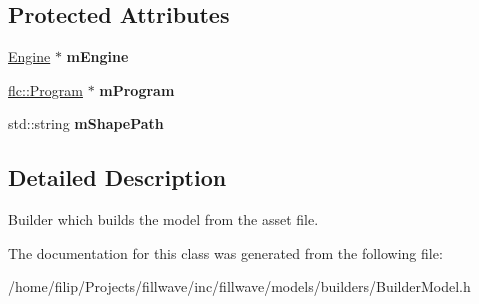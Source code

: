 \subsection*{Protected Attributes}
\begin{DoxyCompactItemize}
\item 
\hyperlink{classflw_1_1Engine}{Engine} $\ast$ {\bfseries m\+Engine}\hypertarget{classflw_1_1flf_1_1BuilderModel_a625e6c302b14ff9775e9ffe3a72b36cb}{}\label{classflw_1_1flf_1_1BuilderModel_a625e6c302b14ff9775e9ffe3a72b36cb}

\item 
\hyperlink{classflw_1_1flc_1_1Program}{flc\+::\+Program} $\ast$ {\bfseries m\+Program}\hypertarget{classflw_1_1flf_1_1BuilderModel_a1ff36d61e2f4ae3e8778293285516a57}{}\label{classflw_1_1flf_1_1BuilderModel_a1ff36d61e2f4ae3e8778293285516a57}

\item 
std\+::string {\bfseries m\+Shape\+Path}\hypertarget{classflw_1_1flf_1_1BuilderModel_ae4afbfefc5abc67be6d88a85dc285df7}{}\label{classflw_1_1flf_1_1BuilderModel_ae4afbfefc5abc67be6d88a85dc285df7}

\end{DoxyCompactItemize}


\subsection{Detailed Description}
Builder which builds the model from the asset file. 

The documentation for this class was generated from the following file\+:\begin{DoxyCompactItemize}
\item 
/home/filip/\+Projects/fillwave/inc/fillwave/models/builders/Builder\+Model.\+h\end{DoxyCompactItemize}
